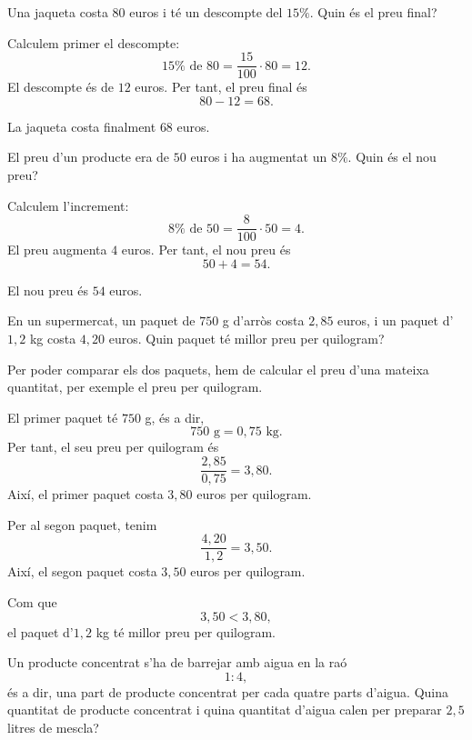 \begin{exercici}[Percentatges]
	Una jaqueta costa \(80\) euros i té un descompte del \(15\%\). Quin és el preu final?
\end{exercici}

\begin{solucio}
	Calculem primer el descompte:
	\[
		15\%\text{ de }80
		=
		\frac{15}{100}\cdot80
		=
		12.
	\]
	El descompte és de \(12\) euros. Per tant, el preu final és
	\[
		80-12=68.
	\]

	La jaqueta costa finalment \(68\) euros.
\end{solucio}

\begin{exercici}
	El preu d'un producte era de \(50\) euros i ha augmentat un \(8\%\). Quin és el nou preu?
\end{exercici}

\begin{solucio}
	Calculem l'increment:
	\[
		8\%\text{ de }50
		=
		\frac{8}{100}\cdot50
		=
		4.
	\]
	El preu augmenta \(4\) euros. Per tant, el nou preu és
	\[
		50+4=54.
	\]

	El nou preu és \(54\) euros.
\end{solucio}

\begin{exercici}
	En un supermercat, un paquet de \(750\) g d'arròs costa \(2{,}85\) euros, i un paquet d'\(1{,}2\) kg costa \(4{,}20\) euros. Quin paquet té millor preu per quilogram?
\end{exercici}

\begin{solucio}
	Per poder comparar els dos paquets, hem de calcular el preu d'una mateixa quantitat, per exemple el preu per quilogram.

	El primer paquet té \(750\) g, és a dir,
	\[
		750\text{ g}=0{,}75\text{ kg}.
	\]
	Per tant, el seu preu per quilogram és
	\[
		\frac{2{,}85}{0{,}75}=3{,}80.
	\]
	Així, el primer paquet costa \(3{,}80\) euros per quilogram.

	Per al segon paquet, tenim
	\[
		\frac{4{,}20}{1{,}2}=3{,}50.
	\]
	Així, el segon paquet costa \(3{,}50\) euros per quilogram.

	Com que
	\[
		3{,}50<3{,}80,
	\]
	el paquet d'\(1{,}2\) kg té millor preu per quilogram.
\end{solucio}

\begin{exercici}
	Un producte concentrat s'ha de barrejar amb aigua en la raó
	\[
		1:4,
	\]
	és a dir, una part de producte concentrat per cada quatre parts d'aigua. Quina quantitat de producte concentrat i quina quantitat d'aigua calen per preparar \(2{,}5\) litres de mescla?
\end{exercici}

